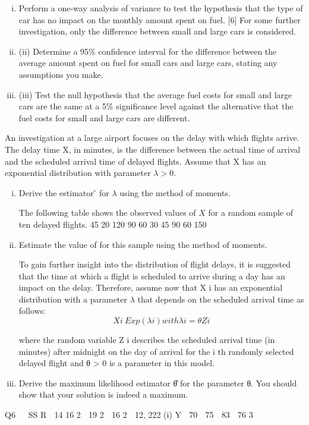 \documentclass[a4paper,12pt]{article}
\begin{document}
\begin{enumerate}
\begin{enumerate}[(i)]
\item %
Perform a one-way analysis of variance to test the hypothesis that the type of
car has no impact on the monthly amount spent on fuel.
[6]
For some further investigation, only the difference between small and large cars is
considered.
\item (ii) Determine a 95\% confidence interval for the difference between the average
amount spent on fuel for small cars and large cars, stating any assumptions
you make.
\item 
(iii) Test the null hypothesis that the average fuel costs for small and large cars are
the same at a 5\% significance level against the alternative that the fuel costs
for small and large cars are different.
\end{enumerate}
An investigation at a large airport focuses on the delay with which flights arrive. The delay time X, in minutes, is the difference between the actual time of arrival and the scheduled arrival time of delayed flights. Assume that X has an exponential
distribution with parameter $\lambda > 0$.
\begin{enumerate}[(i)]
\item
Derive the estimator \lambdâ for $\lambda$ using the method of moments.

The following table shows the observed values of $X$ for a random sample of ten
delayed flights.
45 20 120 90 60 30 45 90 60 150
\item 
Estimate the value of \lambda for this sample using the method of moments.

To gain further insight into the distribution of flight delays, it is suggested that the
time at which a flight is scheduled to arrive during a day has an impact on the delay.
Therefore, assume now that X i has an exponential distribution with a parameter $\lambda$ that depends on the scheduled arrival time as follows:
\[X i ~ Exp( \lambda i ) with \lambda i = θ Z i\]

where the random variable Z i describes the scheduled arrival time (in minutes) after
midnight on the day of arrival for the i th randomly selected delayed flight and θ > 0 is
a parameter in this model.
\item 
Derive the maximum likelihood estimator θ̂ for the parameter θ. You should
show that your solution is indeed a maximum.
\end{enumerate}
\newpage
Q6


SS R  14 16 2  19 2  16 2  12, 222
(i)
Y 
70  75  83
 76
3



\end{enumerate}
\end{document}
